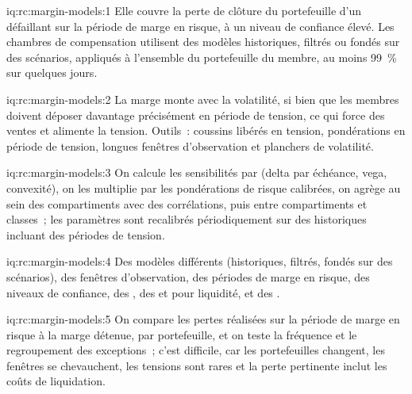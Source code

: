 \begin{solution}{iq:rc:margin-models:1}
Elle couvre la perte de clôture du portefeuille d'un défaillant sur la période de marge en risque, à un niveau de
confiance élevé. Les chambres de compensation utilisent des modèles historiques, filtrés ou fondés sur des scénarios, appliqués à l'ensemble du portefeuille du membre,
au moins 99~\% sur quelques jours.
\end{solution}

\begin{solution}{iq:rc:margin-models:2}
La marge monte avec la volatilité, si bien que les membres doivent déposer davantage précisément en période de tension, ce qui force des ventes et
alimente la tension. Outils~: coussins libérés en tension, pondérations en période de tension, longues fenêtres d'observation et
planchers de volatilité.
\end{solution}

\begin{solution}{iq:rc:margin-models:3}
On calcule les sensibilités par  (delta par échéance, vega, convexité), on les multiplie par les pondérations de risque calibrées,
on agrège au sein des compartiments avec des corrélations, puis entre compartiments et classes~; les paramètres sont
recalibrés périodiquement sur des historiques incluant des périodes de tension.
\end{solution}

\begin{solution}{iq:rc:margin-models:4}
Des modèles différents (historiques, filtrés, fondés sur des scénarios), des fenêtres d'observation, des périodes de marge en risque, des niveaux de confiance,
des , des  et pour liquidité, et des .
\end{solution}

\begin{solution}{iq:rc:margin-models:5}
On compare les pertes réalisées sur la période de marge en risque à la marge détenue, par portefeuille, et on teste
la fréquence et le regroupement des exceptions~; c'est difficile, car les portefeuilles changent, les fenêtres se chevauchent, les tensions sont rares et la
perte pertinente inclut les coûts de liquidation.
\end{solution}

